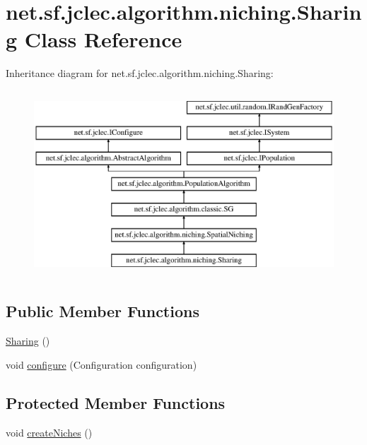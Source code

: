 \hypertarget{classnet_1_1sf_1_1jclec_1_1algorithm_1_1niching_1_1_sharing}{\section{net.\-sf.\-jclec.\-algorithm.\-niching.\-Sharing Class Reference}
\label{classnet_1_1sf_1_1jclec_1_1algorithm_1_1niching_1_1_sharing}
}
Inheritance diagram for net.\-sf.\-jclec.\-algorithm.\-niching.\-Sharing\-:\begin{figure}[H]
\begin{center}
\leavevmode
\includegraphics[height=7.000000cm]{classnet_1_1sf_1_1jclec_1_1algorithm_1_1niching_1_1_sharing}
\end{center}
\end{figure}
\subsection*{Public Member Functions}
\begin{DoxyCompactItemize}
\item 
\hyperlink{classnet_1_1sf_1_1jclec_1_1algorithm_1_1niching_1_1_sharing_a5db2b08350e94b26a9911a5aba795166}{Sharing} ()
\item 
void \hyperlink{classnet_1_1sf_1_1jclec_1_1algorithm_1_1niching_1_1_sharing_ad181eb1b337015677811ccb6c0fee66e}{configure} (Configuration configuration)
\end{DoxyCompactItemize}
\subsection*{Protected Member Functions}
\begin{DoxyCompactItemize}
\item 
void \hyperlink{classnet_1_1sf_1_1jclec_1_1algorithm_1_1niching_1_1_sharing_a27c759a0b98809526aa5c86013df2a68}{create\-Niches} ()
\end{DoxyCompactItemize}
